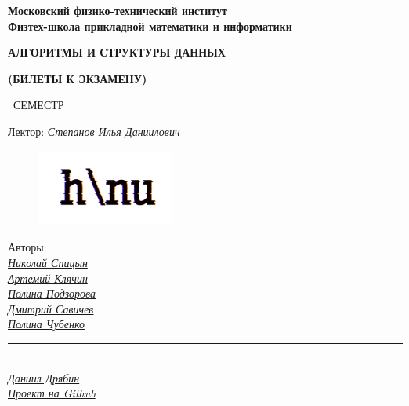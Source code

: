 
\newcommand{\GithubLink}{https://github.com/MIPT-Group/Lectures_Tex_Club}

\begin{titlepage}
	\clearpage\thispagestyle{empty}
	\centering
	
	
	\textbf{Московский физико-технический институт \\ Физтех-школа прикладной математики и информатики}
	\vspace{20ex}
	\vspace{13ex}
	
	{\textbf{{АЛГОРИТМЫ И СТРУКТУРЫ ДАННЫХ}}}

	{\textbf{(БИЛЕТЫ К ЭКЗАМЕНУ)}}
	
	\SemesterNumber\ СЕМЕСТР  
	\vspace{3ex}
	
	Лектор: \textit{Степанов Илья Даниилович}
	
	\begin{figure}[!ht]
		\centering
		\includegraphics[width=0.4\textwidth]{images/logo_ltc.png}
	\end{figure}

	\begin{flushright}
		\noindent
		Авторы: 
		\\
		\href{https://vk.com/spitsynn}{\textit{Николай Спицын}}
		\\
		\href{https://vk.com/id340504554}{\textit{Артемий Клячин}}
		\\
		\href{https://vk.com/id165779384}{\textit{Полина Подзорова}}
		\\
		\href{https://vk.com/dimasav123}{\textit{Дмитрий Савичев}}
		\\
		\href{https://vk.com/poli.dobro}{\textit{Полина Чубенко}}
		\\
		\rule{90pt}{0.5pt}
		\\
		\href{https://vk.com/ax_equals_b}{\textit{Даниил Дрябин}}
		\\
		\href{\GithubLink}{\textit{Проект на Github}}
	\end{flushright}
	
	\vfill
	\CourseDate
	\pagebreak
\end{titlepage}